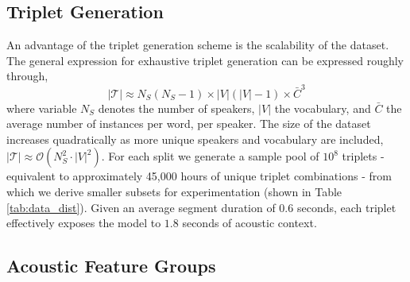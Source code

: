 \documentclass[conference,letterpaper]{IEEEtran}
\begin{document}
\subsection{Triplet Generation}
\label{sub_sec:tri_gen}

An advantage of the triplet generation scheme is the scalability of the dataset. The general expression for exhaustive triplet generation can be expressed roughly through, 
\[
    |\mathcal{T}| \approx N_S(N_S - 1) \times |V|(|V| - 1) \times \bar{C}^3
\] 
\noindent where variable $N_S$ denotes the number of speakers, $|V|$ the vocabulary, and $\bar{C}$ the average number of instances per word, per speaker. The size of the dataset increases quadratically as more unique speakers and vocabulary are included, $|\mathcal{T}| \approx \mathcal{O}(N^2_S \cdot |V|^2)$. For each split we generate a sample pool of $10^8$ triplets - equivalent to approximately 45,000 hours of unique triplet combinations - from which we derive smaller subsets for experimentation (shown in Table \ref{tab:data_dist}). Given an average segment duration of $0.6$ seconds, each triplet effectively exposes the model to $1.8$ seconds of acoustic context.

\begin{table}[H]
    \centering
\end{table}


\subsection{Acoustic Feature Groups}
\label{sub:feat_groups}
\end{document}
